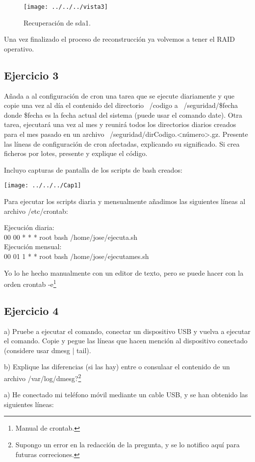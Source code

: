 \documentclass[a4paper, 11pt]{article} %
\begin{document}
\begin{figure}[htpb]
\centering
\texttt{[image: ../../../vista3]}
\caption{Recuperación de sda1.}
\end{figure}

Una vez finalizado el proceso de reconstrucción ya volvemos a tener el RAID operativo. 

\subsection{Ejercicio 3}
Añada a al configuración de cron una tarea que se ejecute diariamente y que copie una vez al día el contenido del directorio ~/codigo a ~/seguridad/\$fecha donde \$fecha es la fecha actual del sistema (puede usar el comando date). Otra tarea, ejecutará una vez al mes y reunirá todos los directorios diarios creados para el mes pasado en un archivo ~/seguridad/dirCodigo.<número>.gz. Presente las líneas de configuración de cron afectadas, explicando su significado. Si crea ficheros por lotes, presente y explique el código. 

Incluyo capturas de pantalla de los scripts de bash creados: 

\texttt{[image: ../../../Cap1]}

Para ejecutar los scripts diaria y mensualmente añadimos las siguientes líneas al archivo /etc/crontab: 

Ejecución diaria:\\
00 00   * * *   root    bash /home/jose/ejecuta.sh\\
Ejecución mensual:\\
00 01   1 * *   root    bash /home/jose/ejecutames.sh

Yo lo he hecho manualmente con un editor de texto, pero se puede hacer con la orden crontab -e\footnote{Manual de crontab.}

\subsection{Ejercicio 4}
a) Pruebe a ejecutar el comando, conectar un dispositivo USB y vuelva a ejecutar el comando. Copie y pegue las líneas que hacen mención al dispositivo conectado (considere usar dmesg | tail). 

b) Explique las diferencias (si las hay) entre o consulaar el contenido de un archivo /var/log/dmesg?\footnote{Supongo un error en la redacción de la pregunta, y se lo notifico aquí para futuras correciones.}


a) He conectado mi teléfono móvil mediante un cable USB, y se han obtenido las siguientes líneas: 
\end{document}
